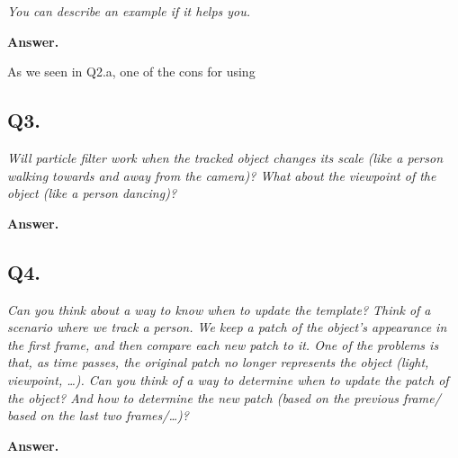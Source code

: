\documentclass[11pt]{article}
\begin{document}
\medskip
\noindent\textit{You can describe an example if it helps you.}

\medskip
\noindent\textbf{Answer.}

  As we seen in Q2.a, one of the cons for using
\vspace{0.5cm}

\subsection*{Q3.}
\noindent\textit{Will particle filter work when the tracked object changes its scale (like a
person walking towards and away from the camera)? What about the viewpoint of the object (like
a person dancing)?}

\medskip
\noindent\textbf{Answer.}

\vspace{0.5cm}

\subsection*{Q4.}
\noindent\textit{Can you think about a way to know when to update the template? Think of a
scenario where we track a person. We keep a patch of the object's appearance in the first frame,
and then compare each new patch to it. One of the problems is that, as time passes, the original
patch no longer represents the object (light, viewpoint, \ldots). Can you think of a way to
determine when to update the patch of the object? And how to determine the new patch (based on
the previous frame/ based on the last two frames/\ldots)?}

\medskip
\noindent\textbf{Answer.}

\vspace{0.5cm}
\end{document}
